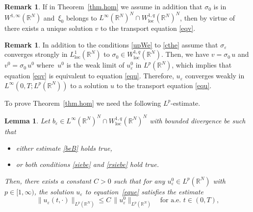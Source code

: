 \documentclass[11pt]{article}
\newcommand{\loc}{\mathrm{loc}}
\def \RR {\mathbb R}
\theoremstyle{plain}
\newtheorem{Lem}[Thm]{Lemma}
\theoremstyle{definition}
\newtheorem{Rem}[Thm]{Remark}
\numberwithin{equation}{section}
\begin{document}
\begin{Rem}\label{rem.uni}
If in Theorem~\ref{thm.hom} we assume in addition that $\sigma_0$ is in $W^{1,\infty}(\RR^N)$ and~$\xi_0$ belongs to $L^\infty(\RR^N)^N\cap W^{1,q}_\loc(\RR^N)^N$, then by virtue of \cite[Cor.\,II.1]{DiLi} there exists a unique solution $v$ to the transport equation \eqref{eqv}.
\end{Rem}
\begin{Rem}\label{rem.vsiu}
In addition to the conditions \eqref{upWe} to \eqref{cthe} assume that $\sigma_\varepsilon$ converges strongly in $L^1_\loc(\RR^N)$ to $\sigma_0\in W^{1,q}_\loc(\RR^N)$. Then, we have $v=\sigma_0\,u$ and $v^0=\sigma_0\,u^0$ where~$u^0$ is the weak limit of $u_\varepsilon^0$ in $L^p(\RR^N)$, which implies that equation \eqref{eqv} is equivalent to equation \eqref{equ}. Therefore, $u_\varepsilon$ converges weakly in $L^\infty(0,T;L^p(\RR^N))$ to a solution $u$ to the transport equation \eqref{equ}.
\end{Rem}
To prove Theorem~\ref{thm.hom} we need the following $L^p$-estimate.
\begin{Lem}\label{lem.Lpeue}
Let $b_\varepsilon\in L^\infty(\RR^N)^N\cap W^{1,q}_\loc(\RR^N)^N$ with bounded divergence be such that
\begin{itemize}
\item either estimate \eqref{beB} holds true,
\item or both conditions \eqref{siebe} and \eqref{rsiebe} hold true.
\end{itemize}
Then, there exists a constant $C>0$ such that for any $u_\varepsilon^0\in L^p(\RR^N)$ with $p\in[1,\infty)$, the solution $u_\varepsilon$ to equation~\eqref{eque} satisfies the estimate
\begin{equation}\label{Lpeue}
\|u_\varepsilon(t,\cdot)\|_{L^p(\RR^N)}\leq C\,\|u_\varepsilon^0\|_{L^p(\RR^N)}\quad\mbox{for a.e. }t\in(0,T),
\end{equation}
\end{Lem}
\end{document}

